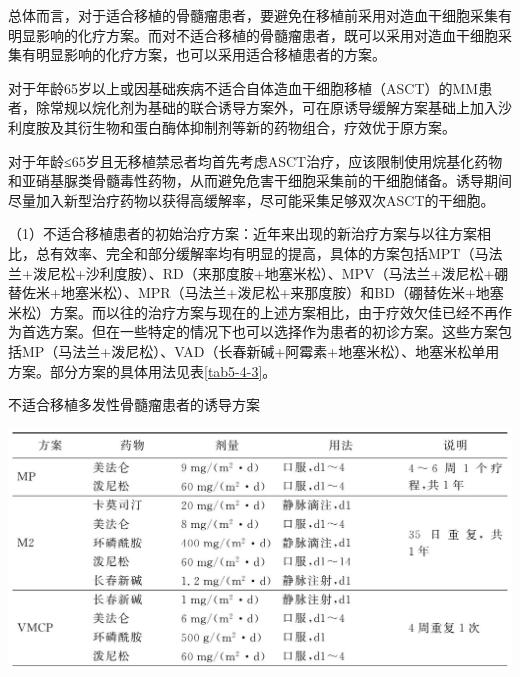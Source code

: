 总体而言，对于适合移植的骨髓瘤患者，要避免在移植前采用对造血干细胞采集有明显影响的化疗方案。而对不适合移植的骨髓瘤患者，既可以采用对造血干细胞采集有明显影响的化疗方案，也可以采用适合移植患者的方案。

对于年龄65岁以上或因基础疾病不适合自体造血干细胞移植（ASCT）的MM患者，除常规以烷化剂为基础的联合诱导方案外，可在原诱导缓解方案基础上加入沙利度胺及其衍生物和蛋白酶体抑制剂等新的药物组合，疗效优于原方案。

对于年龄≤65岁且无移植禁忌者均首先考虑ASCT治疗，应该限制使用烷基化药物和亚硝基脲类骨髓毒性药物，从而避免危害干细胞采集前的干细胞储备。诱导期间尽量加入新型治疗药物以获得高缓解率，尽可能采集足够双次ASCT的干细胞。

（1）不适合移植患者的初始治疗方案：近年来出现的新治疗方案与以往方案相比，总有效率、完全和部分缓解率均有明显的提高，具体的方案包括MPT（马法兰+泼尼松+沙利度胺）、RD（来那度胺+地塞米松）、MPV（马法兰+泼尼松+硼替佐米+地塞米松）、MPR（马法兰+泼尼松+来那度胺）和BD（硼替佐米+地塞米松）方案。而以往的治疗方案与现在的上述方案相比，由于疗效欠佳已经不再作为首选方案。但在一些特定的情况下也可以选择作为患者的初诊方案。这些方案包括MP（马法兰+泼尼松）、VAD（长春新碱+阿霉素+地塞米松）、地塞米松单用方案。部分方案的具体用法见表\ref{tab5-4-3}。

\begin{table}[htbp]
\centering
\caption{不适合移植多发性骨髓瘤患者的诱导方案}
\label{tab5-4-3}
\includegraphics{./images/Image00159.jpg}
\end{table}

